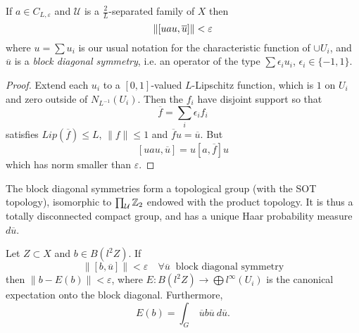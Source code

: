 \begin{lem}
If $a \in C_{L,\varepsilon}$ and $\mathcal U $ is a $\frac{2}{L}$-separated family of $X$ then
\[ \| [uau , \overline{u}] \| \\< \varepsilon \]
where $u =\sum u_i$ is our usual notation for the characteristic function of $\cup U_i$, and $\overline u$ is a \textit{block diagonal symmetry}, i.e. an operator of the type $\sum \epsilon_i u_i$, $\epsilon_i\in \{ -1, 1\}$.
\end{lem}

\begin{proof}
Extend each $u_i$ to a $[0,1]$-valued $L$-Lipschitz function, which is $1$ on $U_i$ and zero outside of $N_{L^{-1}}(U_i)$. Then the $f_i$ have disjoint support so that
\[\overline{f}=\sum_i \epsilon_i f_i \]
satisfies $Lip (\overline f )\leq L $, $\| f \| \leq 1$ and $\overline f u =\overline u$. But 
\[[uau , \overline u ] = u [a, \overline f ] u \]   
which has norm smaller than $\varepsilon$.
\end{proof}

The block diagonal symmetries form a topological group (with the SOT topology), isomorphic to $\prod_{\mathcal U} \mathbb Z_2$ endowed with the product topology. It is thus a totally disconnected compact group, and has a unique Haar probability measure $d\overline u$.

\begin{lem}
Let $Z \subset X$ and $b \in B(l^2 Z)$. If \[ \| [b, \overline u ] \| < \varepsilon \quad \forall \overline u \ \text{ block diagonal symmetry} \]
then $\| b - E(b) \| < \varepsilon$, where $E: B(l^2 Z) \rightarrow \bigoplus  l^\infty (U_i)$ is the canonical expectation onto the block diagonal. Furthermore,
\[E(b) = \int_G \ \overline u  b \overline u  \ d\overline u.\]
\end{lem}

